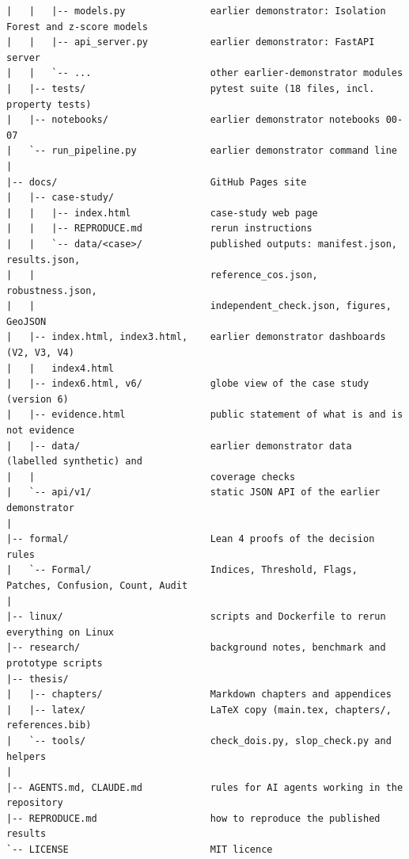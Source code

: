 {\begin{verbatim}
|   |   |-- models.py               earlier demonstrator: Isolation Forest and z-score models
|   |   |-- api_server.py           earlier demonstrator: FastAPI server
|   |   `-- ...                     other earlier-demonstrator modules
|   |-- tests/                      pytest suite (18 files, incl. property tests)
|   |-- notebooks/                  earlier demonstrator notebooks 00-07
|   `-- run_pipeline.py             earlier demonstrator command line
|
|-- docs/                           GitHub Pages site
|   |-- case-study/
|   |   |-- index.html              case-study web page
|   |   |-- REPRODUCE.md            rerun instructions
|   |   `-- data/<case>/            published outputs: manifest.json, results.json,
|   |                               reference_cos.json, robustness.json,
|   |                               independent_check.json, figures, GeoJSON
|   |-- index.html, index3.html,    earlier demonstrator dashboards (V2, V3, V4)
|   |   index4.html
|   |-- index6.html, v6/            globe view of the case study (version 6)
|   |-- evidence.html               public statement of what is and is not evidence
|   |-- data/                       earlier demonstrator data (labelled synthetic) and
|   |                               coverage checks
|   `-- api/v1/                     static JSON API of the earlier demonstrator
|
|-- formal/                         Lean 4 proofs of the decision rules
|   `-- Formal/                     Indices, Threshold, Flags, Patches, Confusion, Count, Audit
|
|-- linux/                          scripts and Dockerfile to rerun everything on Linux
|-- research/                       background notes, benchmark and prototype scripts
|-- thesis/
|   |-- chapters/                   Markdown chapters and appendices
|   |-- latex/                      LaTeX copy (main.tex, chapters/, references.bib)
|   `-- tools/                      check_dois.py, slop_check.py and helpers
|
|-- AGENTS.md, CLAUDE.md            rules for AI agents working in the repository
|-- REPRODUCE.md                    how to reproduce the published results
`-- LICENSE                         MIT licence
\end{verbatim}
}

